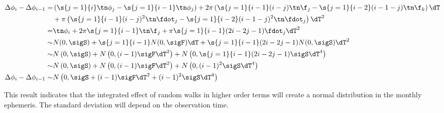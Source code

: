\begin{align}
\Delta \phi_{i} - \Delta \phi_{i-1} = &  \left(\s{j=1}{i}\tn \phi_{j} 
-  \s{j=1}{i-1}\tn \phi_{j}\right) + 2\pi\left(\s{j=1}{i-1}(i-j)\tn \f_{j}  
-  \s{j=1}{i-2}(i-1-j)\tn \f_{k} \right)\dT \notag \\
& + \pi\left(\s{j=1}{i-1}(i-j)^{2}\tn \fdot_{j} 
- \s{j=1}{i-2}(i-1-j)^{2}\tn \fdot_{j}\right)\dT^{2} \\
= &  \tn \phi_{i} +  2\pi \s{j=1}{i-1}\tn\f_{j} 
+ \pi \s{j=1}{i-1}(2i - 2j -1)\fdot_{j}\dT^{2} \\
\sim &  N(0, \sigS) + \s{j=1}{i-1}N(0, \sigF) \dT 
+ \s{j=1}{i-1}(2i - 2j -1)N(0, \sigS) \dT^{2}  \\
\sim &  N\left(0, \sigS\right) + N\left(0, (i-1)\sigF\dT^{2}\right) 
+ N\left(0, \s{j=1}{i-1}(2i - 2j -1)\sigS\dT^{4}\right)  \\
\sim &  N\left(0, \sigS\right) + N\left(0, (i-1)\sigF\dT^{2}\right) 
+ N\left(0, (i-1)^{2}\sigS\dT^{4}\right)  \\
\Delta \phi_{i} - \Delta \phi_{i-1}  \sim & N\left(0, \sigS 
+ (i-1)\sigF\dT^{2} + (i-1)^{2}\sigS\dT^{4}\right)
\end{align}

This result indicates that the integrated effect of random walks in higher
order terms will create a normal distribution in the monthly ephemeris. The
standard deviation will
depend on the observation time. 


